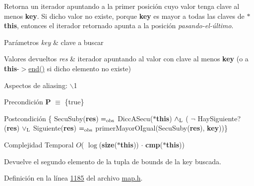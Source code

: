 \-Retorna un iterador apuntando a la primer posición cuyo valor tenga clave al menos {\bfseries key}. \-Si dicho valor no existe, porque {\bfseries key} es mayor a todas las claves de {\bfseries $\ast$this}, entonces el iterador retornado apunta a la posición {\itshape pasando-\/el-\/último\/}.


\begin{DoxyParams}{\-Parámetros}
{\em key} & clave a buscar \\
\hline
\end{DoxyParams}

\begin{DoxyRetVals}{\-Valores devueltos}
{\em res} & iterador apuntando al valor con clave al menos {\bfseries key} (o a {\bfseries this}-\/$>$\hyperlink{classaed2_1_1map_a76023e6a56cb625513e1b5ea028bf983_a76023e6a56cb625513e1b5ea028bf983}{end()} si dicho elemento no existe)\\
\hline
\end{DoxyRetVals}
\begin{DoxyParagraph}{\-Aspectos de aliasing\-:}
$\backslash$1
\end{DoxyParagraph}
\begin{DoxyPrecond}{\-Precondición}
{\bfseries \-P} $\equiv$ \{true\} 
\end{DoxyPrecond}
\begin{DoxyPostcond}{\-Postcondición}
\{ \-Secu\-Suby({\bfseries res}) $=_{\rm obs}$ \-Dicc\-A\-Secu({\bfseries $\ast$this}) $\land_{\rm L}$ ( $\lnot$ \-Hay\-Siguiente?({\bfseries res}) $\lor_{\rm L}$ \-Siguiente({\bfseries res}) $=_{\rm obs}$ primer\-Mayor\-O\-Igual(\-Secu\-Suby({\bfseries res}), {\bfseries key}))\}
\end{DoxyPostcond}

\begin{DoxyDescription}
\item[\-Complejidad \-Temporal]$O$( $\log$({\bfseries size}({\bfseries $\ast$this})) $\cdot$ {\bfseries cmp}({\bfseries $\ast$this}))
\end{DoxyDescription}

\-Devuelve el segundo elemento de la tupla de bounds de la key buscada. 

\-Definición en la línea \hyperlink{map_8h_source_l01185}{1185} del archivo \hyperlink{map_8h_source}{map.\-h}.

